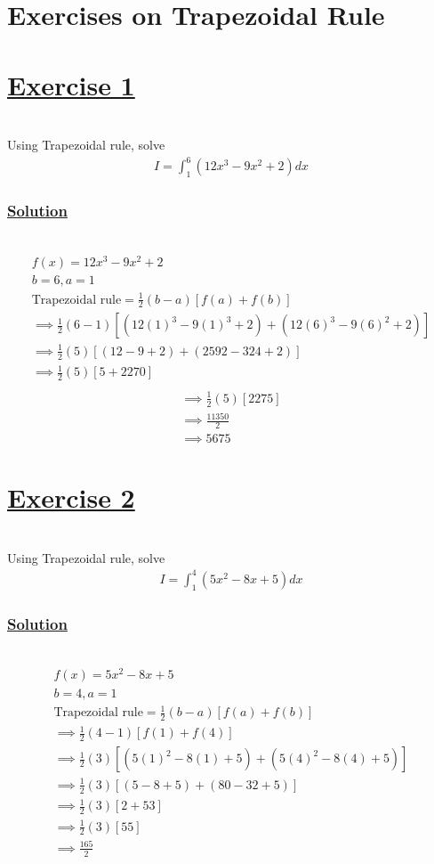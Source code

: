 \documentclass[12pt]{report}
\newcommand{\ubt}[1]{\textbf{\underline{#1}}}
\newcommand{\spn}[1]{\\[#1cm]}
\newcommand{\solution}{\subsubsection{\ubt{Solution}}{~}\spn{-1}}
\newcommand{\exercise}[1]{\section*{\ubt{Exercise #1}}{~}\spn{-1}}
\begin{document}
	\section{Exercises on Trapezoidal Rule}
	\exercise{1}
	Using Trapezoidal rule, solve
	\begin{eqnarray*}
		I = \int_1^6 (12x^3 - 9x^2 + 2) dx
	\end{eqnarray*}
	\solution
	\begin{gather*}
		f(x) = 12x^3 - 9x^2 + 2\\
		b=6, a=1\\
		\text{Trapezoidal rule} = \frac{1}{2}(b-a)[f(a) + f(b)]\\
		\implies \frac{1}{2} (6-1) [(12(1)^3 - 9(1)^3 + 2) + (12(6)^3 - 9(6)^2 + 2)]\\
		\implies \frac{1}{2} (5) [(12-9+2) + (2592-324 + 2)]\\
		\implies \frac{1}{2} (5) [5+2270]\\
	\end{gather*}
	\begin{gather*}
		\implies \frac{1}{2} (5)[2275]\\
		\implies \frac{11350}{2}\\
		\implies 5675
	\end{gather*}
	
	\exercise{2}
	Using Trapezoidal rule, solve
	\begin{gather*}
		I=\int_1^4(5x^2-8x+5)dx
	\end{gather*}
	\solution
	\begin{gather*}
		f(x) = 5x^2 - 8x + 5\\
		b=4, a=1\\
		\text{Trapezoidal rule} = \frac{1}{2}(b-a)[f(a) + f(b)]\\
		\implies \frac{1}{2}(4-1)[f(1) + f(4)]\\
		\implies \frac{1}{2}(3)[(5(1)^2 - 8(1) + 5) + (5(4)^2 - 8(4) + 5)]\\
		\implies \frac{1}{2}(3)[(5-8+5) + (80-32+5)]\\
		\implies \frac{1}{2}(3)[2+53]\\
		\implies \frac{1}{2}(3)[55]\\
		\implies \frac{165}{2}
	\end{gather*}
	
	
\end{document}
